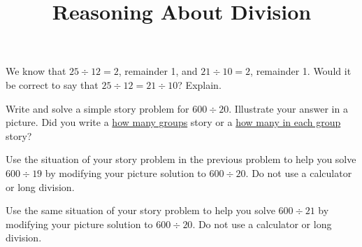 \documentclass[nooutcomes,noauthor,handout]{ximera}
\title{Reasoning About Division}
\begin{document}
\begin{abstract} \end{abstract}
\maketitle


\begin{problem}
We know that $25 \div 12 = 2$, remainder 1, and
$21 \div 10 = 2$, remainder 1. 
Would it be correct to say that $25 \div 12 = 21 \div 10$?  Explain.


\end{problem}


\begin{problem}
 Write and solve a simple story problem for $600 \div 20$.  Illustrate your answer in a picture.  Did you write a \underline{how many groups} story or a \underline{how many in each group} story?
\end{problem}

\begin{problem}
  Use the situation of your story problem in the previous problem to help you solve $600 \div 19$ by modifying your picture solution to $600 \div 20$.  Do not use a calculator or long division.
\end{problem}

\begin{problem}
 Use the same situation of your story problem to help you solve $600 \div 21$ by modifying your picture solution to $600 \div 20$.  Do not use a calculator or long division.

\end{problem}

\newpage
\end{document}
